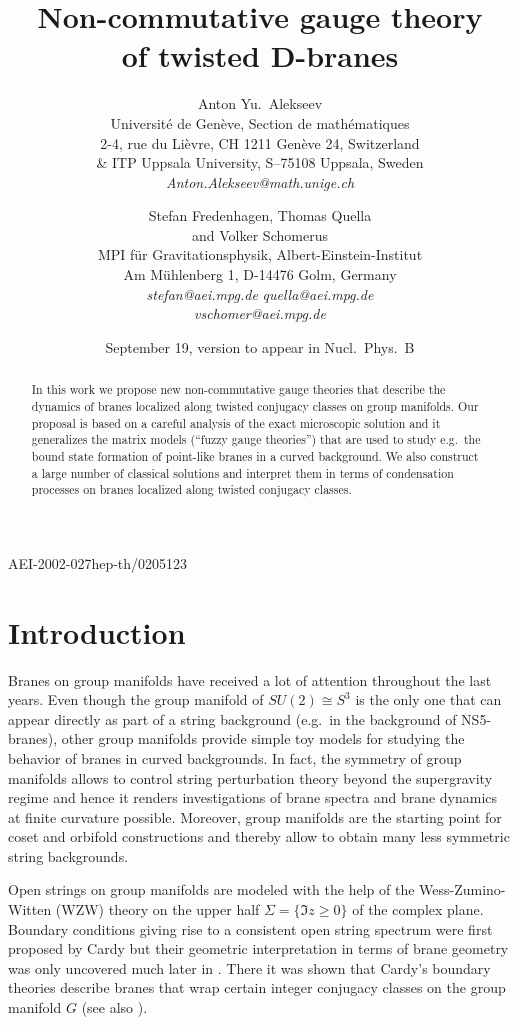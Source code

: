 \documentclass[12pt,a4paper]{article}
\title{\bf Non-commutative gauge theory \\[3mm]  
 \bf of twisted D-branes}
\author{{\sc Anton Yu.\ Alekseev}\\[3mm] 
Universit{\'e} de Gen{\`e}ve, Section de math{\'e}matiques\\ 
2-4, rue du Li{\`e}vre, CH 1211 Gen{\`e}ve 24, Switzerland\\
\& ITP Uppsala University, S--75108 Uppsala, Sweden\\[2mm]
{\em Anton.Alekseev@math.unige.ch} \vspace*{3mm}
\and
{\sc Stefan Fredenhagen, Thomas Quella}\\
 {\sc and Volker Schomerus} \\[3mm] 
MPI f{\"u}r Gravitationsphysik, Albert-Einstein-Institut\\
Am M{\"u}hlenberg 1, D-14476 Golm, Germany\\[2mm]  
{\em stefan@aei.mpg.de}\quad 
{\em quella@aei.mpg.de} \\
 {\em vschomer@aei.mpg.de}}
\date{\medskip\small September 19, version to appear in Nucl.\ Phys.\ B}
\begin{document}
\maketitle
\baselineskip16pt 
  
\begin{abstract}
In this work we propose new non-commutative gauge theories that 
describe the dynamics of branes localized along twisted conjugacy 
classes on group manifolds. Our proposal is based on a careful 
analysis of the exact microscopic solution and it generalizes 
the matrix models (``fuzzy gauge theories'') that are used to 
study e.g.\  the bound state formation of point-like branes in a 
curved background. We also construct a large number of classical 
solutions and interpret them in terms of condensation processes 
on branes localized along twisted conjugacy classes.
\end{abstract}

\vspace*{-20cm}\noindent AEI-2002-027\hfill hep-th/0205123

\newpage
  
\section{Introduction}

Branes on group manifolds have received a lot of attention 
throughout the last years. Even though the group manifold 
of $SU(2) \cong S^3$ is the only one that can appear directly 
as part of a string background (e.g.\ in the background of 
NS5-branes), other group manifolds provide simple toy models 
for studying the behavior of branes in curved backgrounds. In 
fact, the symmetry of group manifolds allows to control string 
perturbation theory beyond the supergravity regime and hence 
it renders investigations of brane spectra and brane dynamics 
at finite curvature possible. Moreover, group manifolds are the 
starting point for coset and orbifold constructions and thereby 
allow to obtain many less symmetric string backgrounds.%
\smallskip

Open strings on group manifolds are modeled with the help 
of the Wess-Zumino-Witten (WZW) theory on the upper half 
$\Sigma = \{ \Im z \geq 0\}$ of the complex plane. Boundary 
conditions giving rise to a consistent open string spectrum 
were first proposed by Cardy \cite{Cardy:1989ir} but their 
geometric interpretation in terms of brane geometry was only 
uncovered much later in \cite{Alekseev:1998mc}. There it was 
shown that Cardy's boundary theories describe branes that 
wrap certain integer conjugacy classes on the group manifold 
$G$ (see also \cite{Gawedzki:1999bq,Stanciu:1999id}). 
\smallskip
\end{document}
